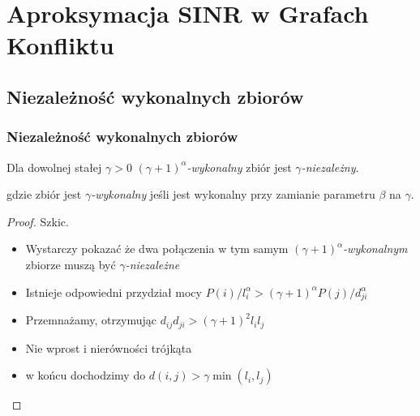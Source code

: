 \documentclass[polish, t,10pt]{beamer}
\begin{document}
\section{Aproksymacja SINR w Grafach Konfliktu}
\subsection{Niezależność wykonalnych zbiorów}
    \begin{frame}
        \frametitle{Niezależność wykonalnych zbiorów}
        \begin{theorem}[1]
            Dla dowolnej stałej $\gamma > 0$ \textit{$(\gamma + 1)^{\alpha}$-wykonalny} zbiór jest \textit{$\gamma$-niezależny}.
        \end{theorem}
        gdzie zbiór jest \textit{$\gamma$-wykonalny} jeśli jest wykonalny przy zamianie parametru $\beta$ na $\gamma$. \\
        \begin{proof}
            Szkic. \\
            \begin{itemize}
                \item Wystarczy pokazać że dwa połączenia w tym samym \textit{$(\gamma + 1)^{\alpha}$-wykonalnym} zbiorze muszą być \textit{$\gamma$-niezależne}
                \item Istnieje odpowiedni przydział mocy $P(i)/l_i^{\alpha} > (\gamma + 1)^{\alpha}P(j)/d_{ji}^{\alpha}$
                \item Przemnażamy, otrzymując $d_{ij}d_{ji} > (\gamma + 1)^2l_i l_j$
                \item Nie wprost i nierówności trójkąta
                \item w końcu dochodzimy do $d(i,j) > \gamma\min(l_i,l_j)$
            \end{itemize}
        \end{proof}
    \end{frame}
\end{document}
